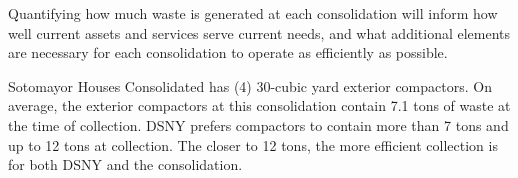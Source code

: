 
    Quantifying how much waste is generated at each consolidation will inform how well current assets and services serve current needs, and what additional elements are necessary for each consolidation to operate as efficiently as possible.
    
    Sotomayor Houses Consolidated has (4) 30-cubic yard exterior compactors. On average, the exterior compactors at this consolidation contain 7.1 tons of waste at the time of collection. DSNY prefers compactors to contain more than 7 tons and up to 12 tons at collection. The closer to 12 tons, the more efficient collection is for both DSNY and the consolidation.